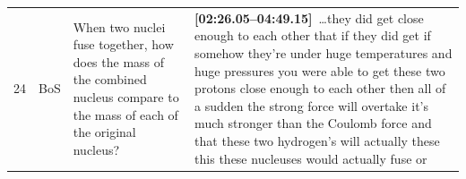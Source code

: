 \documentclass[10pt]{article}
\begin{document}
\begin{tiny}
\begin{longtable}{r p{0.3in} p{1.212in} p{3.8in}}
    24 &          BoS &                                                                                                                                                    When two nuclei fuse together, how does the mass of the combined nucleus compare to the mass of each of the original nucleus? &                                                                                                                                                                                                                                                                                                                                                                                                                                                                                                                                                                                                                                                                                                                                                                                                                                                                                                                                                                                                                                                                                                                                                                                                                                                                                                                                                                                                                                                                                                                                                                                                                                                                                                                                                                                                                                                                                                                                                                                                                                                                                                                                                                                                                                                                                                                                                                                                                                                                                                                                                                                                                                                              \textbf{[02:26.05--04:49.15]}~\ldots they did get close enough to each other that if they did get if somehow they're under huge temperatures and huge pressures you were able to get these two protons close enough to each other then all of a sudden the strong force will overtake it's much stronger than the Coulomb force and that these two hydrogen's will actually these this these nucleuses would actually fuse or 
\end{longtable}
\end{tiny}
\end{document}
